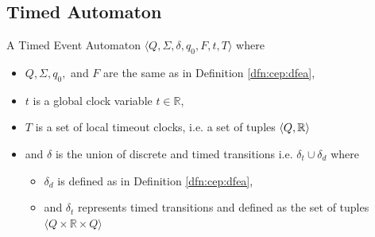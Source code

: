 		\subsection{Timed Automaton}
			\begin{dfn}
				\label{dfn:cep:TEA}
				A Timed Event Automaton $\langle Q,\Sigma,\delta,q_0, F, t, T \rangle$ where
				\begin{itemize}
					\item $Q, \Sigma, q_0,$ and $F$ are the same as in Definition \ref{dfn:cep:dfea},
					\item $t$ is a global clock variable $t \in \mathbb{R}$,
					\item $T$ is a set of local timeout clocks, i.e. a set of tuples $\langle Q, \mathbb{R} \rangle$
					\item and $\delta$ is the union of discrete and timed transitions i.e. $\delta_t \cup \delta_d$ where
					\begin{itemize}
						\item $\delta_d$ is defined as in Definition \ref{dfn:cep:dfea},
						\item and $\delta_t$ represents timed transitions and defined as the set of tuples $\langle Q \times \mathbb{R} \times Q \rangle$ 
					\end{itemize}
				\end{itemize}
			\end{dfn}
			
